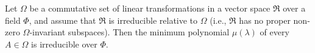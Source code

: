 Let $\Omega$ be a commutative set of linear transformations in a vector space $\Re$ over a field $\Phi$, and assume that $\Re$ is irreducible relative to $\Omega$ (i.e., $\Re$ has no proper non-zero $\Omega$-invariant subspaces). Then the minimum polynomial $\mu(\lambda)$ of every $A \in \Omega$ is irreducible over $\Phi$.

